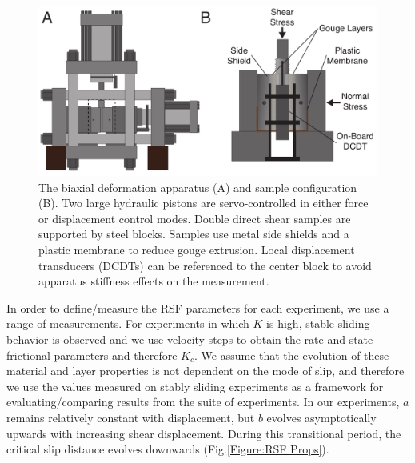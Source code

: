 \documentclass[11pt]{article}
\begin{document}
\begin{figure}
    \centering
    \includegraphics[scale=0.5]{../Figures/Fig_Biax_Schematic/biax_schematic.pdf}
       \caption{The biaxial deformation apparatus (A) and sample configuration (B).
       Two large hydraulic pistons are servo-controlled in either force or
       displacement control modes. Double direct shear samples are supported by
       steel blocks. Samples use metal side shields and a plastic membrane to
       reduce gouge extrusion.  Local displacement transducers (DCDTs) can be
       referenced to the center block to avoid apparatus stiffness effects on
       the measurement.}
      \label{Fig:Biax Schematic}
\end{figure}

In order to define/measure the RSF parameters for each experiment, we use a
range of measurements. For experiments in which $K$ is high, stable sliding
behavior is  observed and we use velocity steps to obtain the rate-and-state
frictional parameters and therefore $K_c$.  We assume that the evolution of
these material and layer properties is not dependent on the mode of slip, and
therefore we use the values measured on stably sliding experiments as a
framework for evaluating/comparing results from the suite of experiments. In our
experiments, $a$ remains relatively constant with displacement, but $b$ evolves
asymptotically upwards with increasing shear displacement. During this
transitional period, the critical slip distance evolves downwards
(Fig.\ref{Figure:RSF Props}).
\end{document}
